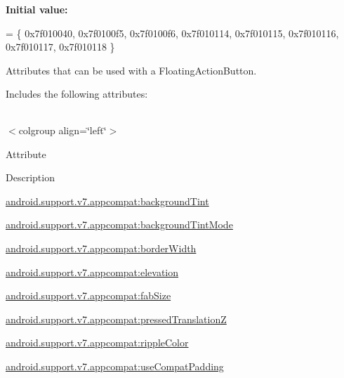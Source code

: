 {\bfseries Initial value\+:}
\begin{DoxyCode}
= \{
            0x7f010040, 0x7f0100f5, 0x7f0100f6, 0x7f010114,
            0x7f010115, 0x7f010116, 0x7f010117, 0x7f010118
        \}
\end{DoxyCode}
Attributes that can be used with a Floating\+Action\+Button. 

Includes the following attributes\+:

\tabulinesep=1mm
\begin{longtabu} spread 0pt [c]{*{0}{|X[-1]}|}
\hline
\end{longtabu}
$<$colgroup align=\char`\"{}left\char`\"{}$>$ 

Attribute

Description 

{\ttfamily \hyperlink{classandroid_1_1support_1_1v7_1_1appcompat_1_1R_1_1styleable_a59bc6ada4a0ec9c433ebf84217630493}{android.\+support.\+v7.\+appcompat\+:background\+Tint}}

{\ttfamily \hyperlink{classandroid_1_1support_1_1v7_1_1appcompat_1_1R_1_1styleable_ab01d5ebdb493f8bb1f9595ee05409bfb}{android.\+support.\+v7.\+appcompat\+:background\+Tint\+Mode}}

{\ttfamily \hyperlink{classandroid_1_1support_1_1v7_1_1appcompat_1_1R_1_1styleable_a90c9e09b5a738fa569f0bf4b9cbe536e}{android.\+support.\+v7.\+appcompat\+:border\+Width}}

{\ttfamily \hyperlink{classandroid_1_1support_1_1v7_1_1appcompat_1_1R_1_1styleable_a11aec0e64f52fb4ec43da30d5c89dc2f}{android.\+support.\+v7.\+appcompat\+:elevation}}

{\ttfamily \hyperlink{classandroid_1_1support_1_1v7_1_1appcompat_1_1R_1_1styleable_abfe4b5cb807f029e53b6d0b103915d9d}{android.\+support.\+v7.\+appcompat\+:fab\+Size}}

{\ttfamily \hyperlink{classandroid_1_1support_1_1v7_1_1appcompat_1_1R_1_1styleable_a4b64b16277ffe93157834b6ae898ccb9}{android.\+support.\+v7.\+appcompat\+:pressed\+TranslationZ}}

{\ttfamily \hyperlink{classandroid_1_1support_1_1v7_1_1appcompat_1_1R_1_1styleable_a1b00a775eb9bce08afe75deef83f51f1}{android.\+support.\+v7.\+appcompat\+:ripple\+Color}}

{\ttfamily \hyperlink{classandroid_1_1support_1_1v7_1_1appcompat_1_1R_1_1styleable_ae8d13a787b0f198873c19c0c9ffbf158}{android.\+support.\+v7.\+appcompat\+:use\+Compat\+Padding}}

